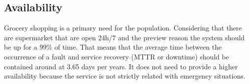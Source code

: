\subsection{Availability}

Grocery shopping is a primary need for the population. Considering that there are supermarket that are open 24h/7 and the preview reason the system should be up for a 99\% of time. That means that the average time between the occurrence of a fault and service recovery (MTTR or downtime) should be contained around at 3.65 days per years. It does not need to provide a higher availability because the service is not strictly related with emergency situations.